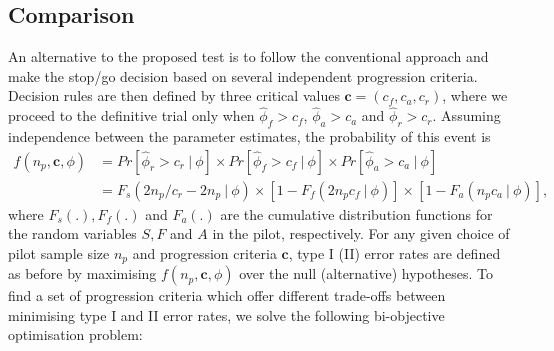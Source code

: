 \documentclass[AMA,STIX1COL]{WileyNJD-v2}
\begin{document}


\subsection{Comparison}\label{sec:comparator}

An alternative to the proposed test is to follow the conventional approach and make the stop/go decision based on several independent progression criteria. Decision rules are then defined by three critical values $\mathbf{c} = (c_f, c_a, c_r)$, where we proceed to the definitive trial only when $\hat{\phi}_f > c_f$, $\hat{\phi}_a > c_a$ and $\hat{\phi}_r > c_r$. Assuming independence between the parameter estimates, the probability of this event is
\begin{align*}
f(n_p, \mathbf{c}, \phi) &= Pr[\hat{\phi}_r > c_r ~ | ~ \phi] \times Pr[ \hat{\phi}_f > c_f ~ | ~ \phi] \times Pr[ \hat{\phi}_a > c_a ~ | ~ \phi] \\
&= F_s( 2n_p/c_r - 2n_p ~ | ~ \phi) \times [1-F_f(2n_p c_f ~ | ~ \phi)] \times [1-F_a(n_p c_a ~ | ~ \phi)],
\end{align*}
where $F_s(.), F_f(.)$ and $F_a(.)$ are the cumulative distribution functions for the random variables $S, F$ and $A$ in the pilot, respectively. For any given choice of pilot sample size $n_p$ and progression criteria $\mathbf{c}$, type I (II) error rates are defined as before by maximising $f(n_p, \mathbf{c}, \phi)$ over the null (alternative) hypotheses. To find a set of progression criteria which offer different trade-offs between minimising type I and II error rates, we solve the following bi-objective optimisation problem:
\end{document}
